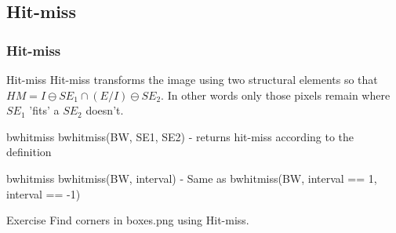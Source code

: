 \documentclass{beamer}
\begin{document}
\subsection{Hit-miss}
\begin{frame}
\frametitle{Hit-miss}
  \begin{block}{Hit-miss}
  Hit-miss transforms the image using two structural elements so that  $HM = I \ominus SE_1 \cap (E / I) \ominus SE_2$. In other words only those pixels remain where $SE_1$ 'fits' a $SE_2$ doesn't.
  \end{block}    
  
  \begin{block}{bwhitmiss}
  bwhitmiss(BW, SE1, SE2) - returns hit-miss according to the definition
  \end{block}   
  
  \begin{block}{bwhitmiss}
  bwhitmiss(BW, interval) - Same as bwhitmiss(BW, interval == 1, interval == -1)
  \end{block}   
  
  \begin{block}{Exercise}
  Find corners in boxes.png using Hit-miss.
  \end{block}   
  
   
\end{frame}
\end{document}
